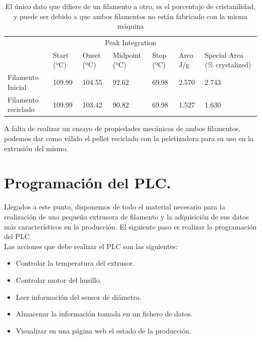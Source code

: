 \begin{table}[H]
    \centering
    \begin{tabular}{lllllll}
        \multicolumn{7}{c}{Peak Integration}                                                                                 \\
                            & Start (ºC) & Onset (ºC) & Midpoint (ºC) & Stop (ºC) & Area J/g & Special Area (\% crystalized) \\ \hline
        Filamento Inicial   & 109.99     & 104.55     & 92.62         & 69.98     & 2.570    & 2.743                         \\
        Filamento reciclado & 109.99     & 103.42     & 90.82         & 69.98     & 1.527    & 1.630                        
    \end{tabular}
    \caption[Datos del DSC con la cristanilidad del filamento]{El único dato que difiere de un filamento a otro, es el porcentaje de cristanilidad, y puede ser debido a que ambos filamentos no están fabricado con la misma máquina}
    \label{tab:dsc2}
\end{table}

A falta de realizar un ensayo de propiedades mecánicas de ambos filamentos, podemos dar como válido el pellet reciclado con la peletizadora para su uso en la extrusión del mismo.

\section{Programación del PLC.}

Llegados a este punto, disponemos de todo el material necesario para la realización de una pequeña extrusora de filamento y la adquisición de sus datos más característicos en la producción. El siguiente paso es realizar la programación del PLC.\\

Las acciones que debe realizar el PLC son las siguientes:

\begin{itemize}
    \item{Controlar la temperatura del extrusor.}
    \item{Controlar motor del husillo.}
    \item{Leer información del sensor de diámetro.}
    \item{Almacenar la información tomada en un fichero de datos.}
    \item{Visualizar en una página web el estado de la producción.}
\end{itemize}

